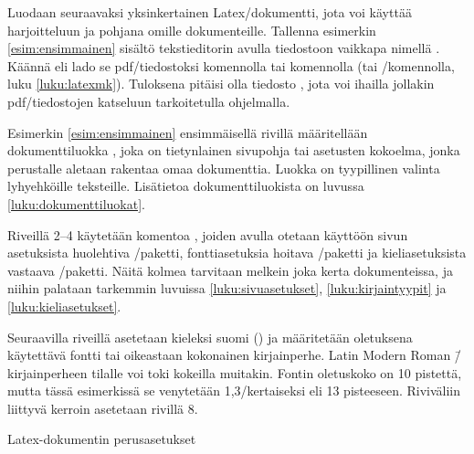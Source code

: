 Luodaan seuraavaksi yksinkertainen Latex\-/dokumentti, jota voi käyttää
harjoitteluun ja pohjana omille dokumenteille. Tallenna esimerkin
\ref{esim:ensimmainen} sisältö tekstieditorin avulla tiedostoon vaikkapa
nimellä . Käännä eli lado se pdf\-/tiedostoksi
komennolla  tai komennolla  (tai \-/komennolla, luku
\ref{luku:latexmk}). Tuloksena pitäisi olla tiedosto ,
jota voi ihailla jollakin pdf\-/tiedostojen katseluun tarkoitetulla
ohjelmalla.

Esimerkin \ref{esim:ensimmainen} ensimmäisellä rivillä määritellään
dokumenttiluokka , joka on tietynlainen sivupohja tai
asetusten kokoelma, jonka perustalle aletaan rakentaa omaa dokumenttia.
Luokka  on tyypillinen valinta lyhyehköille teksteille.
Lisätietoa dokumenttiluokista on luvussa \ref{luku:dokumenttiluokat}.

Riveillä 2--4 käytetään komentoa , joiden avulla
otetaan käyttöön sivun asetuksista huolehtiva
\-/paketti, fontti\-asetuksia hoitava
\-/paketti ja kieli\-asetuksista vastaava
\-/paketti. Näitä kolmea tarvitaan melkein joka
kerta dokumenteissa, ja niihin palataan tarkemmin luvuissa
\ref{luku:sivuasetukset}, \ref{luku:kirjaintyypit} ja
\ref{luku:kieliasetukset}.

Seuraavilla riveillä asetetaan kieleksi suomi () ja
määritetään oletuksena käytettävä fontti tai oikeastaan kokonainen
kirjainperhe. Latin Modern Roman \=/kirjainperheen tilalle voi toki
kokeilla muitakin. Fontin oletuskoko on 10 pistettä, mutta tässä
esimerkissä se venytetään 1,3\-/kertaiseksi eli 13 pisteeseen.
Riviväliin liittyvä kerroin asetetaan rivillä 8.

\begin{esimerkki*}
\caption{Latex-dokumentin perus\-asetukset}
\label{esim:ensimmainen}
\end{esimerkki*}

